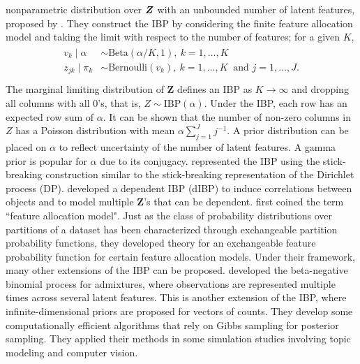 \documentclass[12pt,]{article}
\def\Z{\bm{Z}}
\newcommand{\bZ}{\mbox{\boldmath $Z$}}
\begin{document}
nonparametric distribution over $\bZ$ with an unbounded number of latent
features, proposed by \citet{griffiths2011indian}. 
They construct the IBP by considering the finite feature allocation
model and taking the limit with respect to the number of features; for a given
$K$,
\begin{align}
\begin{split}
v_k \mid \alpha &\sim \text{Beta}(\alpha/K, 1),~ k=1, \ldots, K \\
z_{jk} \mid \pi_k &\sim \text{Bernoulli}(v_k),~ k=1, \ldots, K~\mbox{ and } j=1, \ldots, J. \\
\end{split}
\label{eq:ibp}
\end{align}
The marginal limiting distribution of $\Z$ defines an IBP as $K \rightarrow
\infty$ and dropping all columns with all 0's, that is,  \(Z \sim
\text{IBP}(\alpha)\).
Under the IBP, each row has an expected row sum of $\alpha$.
It can be shown that the number of non-zero columns in $Z$ has a Poisson
distribution with mean $\alpha \sum_{j=1}^J j^{-1}$. A prior
distribution can be placed on \(\alpha\) to reflect uncertainty of the number
of latent features. A gamma prior is popular for $\alpha$ due to its conjugacy.
\cite{teh2007stick} represented the IBP using the stick-breaking construction
similar to the stick-breaking representation of the Dirichlet process (DP).
\cite{williamson2010dependent} developed a dependent IBP (dIBP) to induce
correlations between objects and to model multiple $\Z$'s that can be dependent.
\cite{broderick2015combinatorial} first coined the term ``feature allocation
model". Just as the class of probability distributions over partitions of a
dataset has been characterized through exchangeable partition probability
functions, they developed theory for an exchangeable feature probability
function for certain feature allocation models. Under their framework,
many other extensions of the IBP can be proposed. \cite{broderick2013feature} developed the beta-negative binomial process for
admixtures, where observations are represented multiple times across several
latent features. This is another extension of the IBP, where
infinite-dimensional priors are proposed for vectors of counts. They develop
some computationally efficient algorithms that rely on Gibbs sampling for 
posterior sampling. They applied their methods in some simulation studies 
involving topic modeling and computer vision.
\end{document}
